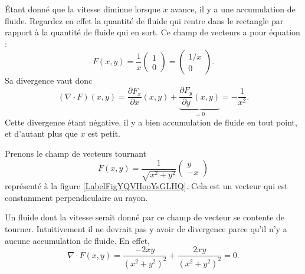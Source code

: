 Étant donné que la vitesse diminue lorsque $x$ avance, il y a une accumulation de fluide. Regardez en effet la quantité de fluide qui rentre dans le rectangle par rapport à la quantité de fluide qui en sort. Ce champ de vecteurs a pour équation :
\begin{equation}
    F(x,y)=\frac{1}{ x }\begin{pmatrix}
        1    \\ 
        0    
    \end{pmatrix}=\begin{pmatrix}
        1/x    \\ 
        0    
    \end{pmatrix}.
\end{equation}
Sa divergence vaut donc
\begin{equation}
    (\nabla\cdot F)(x,y)=\frac{ \partial F_x }{ \partial x }(x,y)+\underbrace{\frac{ \partial F_y }{ \partial y }(x,y)}_{=0}=-\frac{1}{ x^2 }.
\end{equation}
Cette divergence étant négative, il y a bien accumulation de fluide en tout point, et d'autant plus que $x$ est petit.

\begin{example}     \label{ExamDivFrot}

    Prenons le champ de vecteurs tournant
    \begin{equation}
        F(x,y)=\frac{1}{ \sqrt{x^2+y^2} }\begin{pmatrix}
            y    \\ 
            -x    
        \end{pmatrix}
    \end{equation}
    représenté à la figure \ref{LabelFigYQVHooYsGLHQ}. Cela est un vecteur qui est constamment perpendiculaire au rayon.


\newcommand{\CaptionFigYQVHooYsGLHQ}{Le champ de vecteurs $F(x,y)=(y,-x)$.}


    Un fluide dont la vitesse serait donné par ce champ de vecteur se contente de tourner. Intuitivement il ne devrait pas y avoir de divergence parce qu'il n'y a aucune accumulation de fluide. En effet,
    \begin{equation}
        \nabla\cdot F(x,y)=\frac{ -2xy }{ (x^2+y^2)^2 }+\frac{ 2xy }{ (x^2+y^2)^2 }=0.
    \end{equation}
\end{example}

